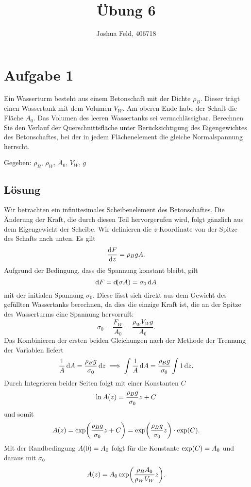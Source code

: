 \documentclass{exercise}
\institute{Lehr- und Forschungsgebiet Kontinuumsmechanik}
\title{Übung 6}
\author{Joshua Feld, 406718}
\begin{document}
    \maketitle
    
    
    \section*{Aufgabe 1}
    
    \begin{problem}
        Ein Wasserturm besteht aus einem Betonschaft mit der Dichte \(\rho_B\).
        Dieser trägt einen Wassertank mit dem Volumen \(V_W\).
        Am oberen Ende habe der Schaft die Fläche \(A_0\).
        Das Volumen des leeren Wassertanks sei vernachlässigbar.
        Berechnen Sie den Verlauf der Querschnittsfläche unter Berücksichtigung des Eigengewichtes des Betonschaftes, bei der in jedem Flächenelement die gleiche Normalspannung herrscht.
        
        Gegeben: \(\rho_B\), \(\rho_W\), \(A_0\), \(V_W\), \(g\)
    \end{problem}
    
    \subsection*{Lösung}
    Wir betrachten ein infinitesimales Scheibenelement des Betonschaftes.
    Die Änderung der Kraft, die durch diesen Teil hervorgerufen wird, folgt gänzlich aus dem Eigengewicht der Scheibe.
    Wir definieren die \(z\)-Koordinate von der Spitze des Schafts nach unten.
    Es gilt
    \[
        \frac{\mathop{\mathrm{d}\!} F}{\mathop{\mathrm{d}\!} z} = \rho_B gA.
    \]
    Aufgrund der Bedingung, dass die Spannung konstant bleibt, gilt
    \[
        \d F = \d\parentheses*{\sigma A} = \sigma_0 \d A
    \]
    mit der initialen Spannung \(\sigma_0\).
    Diese lässt sich direkt aus dem Gewicht des gefüllten Wassertanks berechnen, da dies die einzige Kraft ist, die an der Spitze des Wasserturms eine Spannung hervorruft:
    \[
        \sigma_0 = \frac{F_W}{A_0} = \frac{\rho_W V_W g}{A_0}.
    \]
    Das Kombinieren der ersten beiden Gleichungen nach der Methode der Trennung der Variablen liefert
    \[
        \frac{1}{A}\mathop{\mathrm{d}\!} A = \frac{\rho_B g}{\sigma_0}\mathop{\mathrm{d}\!} z \implies \int\frac{1}{A}\mathop{\mathrm{d}\!} A = \frac{\rho_B g}{\sigma_0}\int 1\mathop{\mathrm{d}\!} z.
    \]
    Durch Integrieren beider Seiten folgt mit einer Konstanten \(C\)
    \[
        \ln A\parentheses*{z} = \frac{\rho_B g}{\sigma_0}z + C
    \]
    und somit
    \[
        A\parentheses*{z} = \exp\parentheses*{\frac{\rho_B g}{\sigma_0}z + C} = \exp\parentheses*{\frac{\rho_B g}{\sigma_0}z} \cdot \exp\parentheses*{C}.
    \]
    Mit der Randbedingung \(A\parentheses*{0} = A_0\) folgt für die Konstante \(\exp\parentheses*{C} = A_0\) und daraus mit \(\sigma_0\)
    \[
        A\parentheses*{z} = A_0\exp\parentheses*{\frac{\rho_B A_0}{\rho_W V_W}z}.
    \]
    
\end{document}
